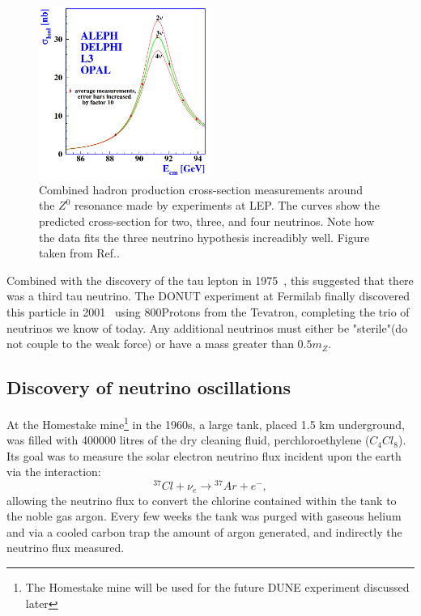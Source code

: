 \begin{figure} %
    \includegraphics[origin=c,width=0.5\textwidth]{diagrams/3-theory/z_resonance.png}
    \caption[z resonance short]
    {Combined hadron production cross-section measurements around the $Z^{0}$ resonance made by
        experiments at LEP. The curves show the predicted cross-section for two, three, and four
        neutrinos. Note how the data fits the three neutrino hypothesis increadibly well.
        Figure taken from Ref.\cite{electroweak2006}.}
    \label{fig:z_resonance}
\end{figure} %

Combined with the discovery of the tau lepton in 1975~\cite{perl1975}, this suggested that there
was a third tau neutrino. The DONUT experiment at Fermilab finally discovered this particle in
2001~\cite{Kodama2001} using 800\GeV Protons from the Tevatron, completing the trio of neutrinos
we know of today. Any additional neutrinos must either be "sterile"(do not couple to the weak
force) or have a mass greater than $0.5m_{Z}$.

\subsection{Discovery of neutrino oscillations} %
\label{sec:theory_history_neutrinos}

At the Homestake mine\footnote{The Homestake mine will be used for the future DUNE experiment
    discussed later} in the 1960s, a large tank, placed 1.5 km underground, was filled with
400000 litres of the dry cleaning fluid, perchloroethylene ($C_{4}Cl_{8}$). Its goal was to
measure the solar electron neutrino flux incident upon the earth via the interaction:
\begin{equation} %
    {}^{37}Cl+\nu_{e}\rightarrow{}^{37}Ar+e^{-},
\end{equation} %
allowing the neutrino flux to convert the chlorine contained within the tank to the noble gas
argon. Every few weeks the tank was purged with gaseous helium and via a cooled carbon trap the
amount of argon generated, and indirectly the neutrino flux measured.

